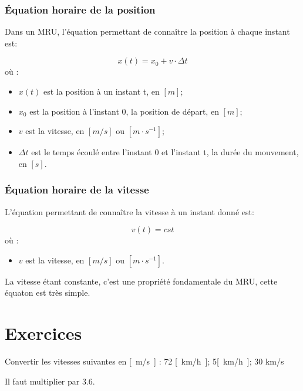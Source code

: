 \subsubsection{Équation horaire de la position}
Dans un MRU, l'équation permettant de connaître la position à chaque instant est:
\begin{encadre}
    \begin{equation}
        x(t)=x_0+v \cdot \Delta t
    \end{equation}
    où :
    \begin{itemize}[label= \textbullet]
        \item \(x(t)\) est la position à un instant t, en \(\unit{[m]}\);
        \item \(x_0\) est la position à l'instant 0, la position de départ, en \(\unit{[m]}\);
        \item \(v\) est la vitesse, en \(\unit{[m/s]}\) ou \(\unit{[m \cdot s^{-1}]}\);
        \item \(\Delta t\) est le temps écoulé entre l'instant 0 et l'instant t, la durée du mouvement, en \([s]\).
    \end{itemize}
\end{encadre}

\subsubsection{Équation horaire de la vitesse}
L'équation permettant de connaître la vitesse à un instant donné est:
\begin{encadre}
    \begin{equation}
        v(t)=cst
    \end{equation}
    où :
    \begin{itemize}[label= \textbullet]
        \item \(v\) est la vitesse, en \(\unit{[m/s]}\) ou \(\unit{[m \cdot s^{-1}]}\).
    \end{itemize}
\end{encadre}
La vitesse étant constante, c'est une propriété fondamentale du MRU, cette équaton est très simple.

\newpage

\section{Exercices}
\begin{exercise}
    Convertir les vitesses suivantes en \unit{[m/s]} : 72 \unit{[km/h]}; 5\unit{[km/h]}; 30 km/s
\end{exercise}
\begin{solution}
    Il faut multiplier par 3.6.
\end{solution}

